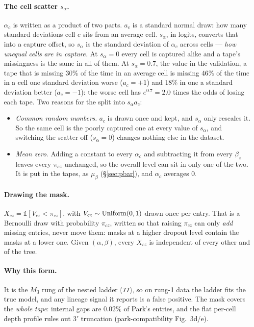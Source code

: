 \paragraph{The cell scatter $s_\alpha$.} $\alpha_c$ is written as a product of two parts. $a_c$ is a
standard normal draw: how many standard deviations cell $c$ sits from an average cell. $s_\alpha$, in
logits, converts that into a capture offset, so $s_\alpha$ is the standard deviation of $\alpha_c$
across cells --- \emph{how unequal cells are in capture.} At $s_\alpha=0$ every cell is captured
alike and a tape's missingness is the same in all of them. At $s_\alpha=0.7$, the value in the
validation, a tape that is missing $30\%$ of the time in an average cell is missing $46\%$ of the time
in a cell one standard deviation worse ($a_c=+1$) and $18\%$ in one a standard deviation better
($a_c=-1$): the worse cell has $e^{0.7}=2.0$ times the odds of losing each tape. Two reasons for the
split into $s_\alpha a_c$:
\begin{itemize}
  \item \emph{Common random numbers.} $a_c$ is drawn once and kept, and $s_\alpha$ only rescales it.
        So the same cell is the poorly captured one at every value of $s_\alpha$, and switching the
        scatter off ($s_\alpha=0$) changes nothing else in the dataset.
  \item \emph{Mean zero.} Adding a constant to every $\alpha_c$ and subtracting it from every $\beta_z$
        leaves every $\pi_{cz}$ unchanged, so the overall level can sit in only one of the two. It is
        put in the tapes, as $\mu_\beta$ (\S\ref{sec:pbar}), and $\alpha_c$ averages $0$.
\end{itemize}

\paragraph{Drawing the mask.} $X_{cz}=\mathbb 1[V_{cz}<\pi_{cz}]$, with $V_{cz}\sim\operatorname{Uniform}(0,1)$
drawn once per entry. That is a Bernoulli draw with probability $\pi_{cz}$, written so that raising
$\pi_{cz}$ can only \emph{add} missing entries, never move them: masks at a higher dropout level
contain the masks at a lower one. Given $(\alpha,\beta)$, every $X_{cz}$ is independent of every other
and of the tree.

\paragraph{Why this form.} It is the $M_3$ rung of the nested ladder (\texttt{77}), so on rung-1 data
the ladder fits the true model, and any lineage signal it reports is a false positive. The mask covers
the \emph{whole tape}: internal gaps are $0.02\%$ of Park's entries, and the flat per-cell depth profile
rules out 3$'$ truncation (park-compatibility Fig.~3d/e).

